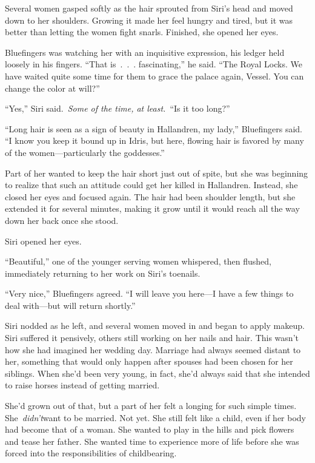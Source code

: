 Several women gasped softly as the hair sprouted from Siri’s head and moved down to her shoulders. Growing it made her feel hungry and tired, but it was better than letting the women fight snarls. Finished, she opened her eyes.

Bluefingers was watching her with an inquisitive expression, his ledger held loosely in his fingers. “That is~.~.~. fascinating,” he said. “The Royal Locks. We have waited quite some time for them to grace the palace again, Vessel. You can change the color at will?”

“Yes,” Siri said.~\textit{Some of the time, at least.}~“Is it too long?”

“Long hair is seen as a sign of beauty in Hallandren, my lady,” Bluefingers said. “I know you keep it bound up in Idris, but here, flowing hair is favored by many of the women—particularly the goddesses.”

Part of her wanted to keep the hair short just out of spite, but she was beginning to realize that such an attitude could get her killed in Hallandren. Instead, she closed her eyes and focused again. The hair had been shoulder length, but she extended it for several minutes, making it grow until it would reach all the way down her back once she stood.

Siri opened her eyes.

“Beautiful,” one of the younger serving women whispered, then flushed, immediately returning to her work on Siri’s toenails.

“Very nice,” Bluefingers agreed. “I will leave you here—I have a few things to deal with—but will return shortly.”

Siri nodded as he left, and several women moved in and began to apply makeup. Siri suffered it pensively, others still working on her nails and hair. This wasn’t how she had imagined her wedding day. Marriage had always seemed distant to her, something that would only happen after spouses had been chosen for her siblings. When she’d been very young, in fact, she’d always said that she intended to raise horses instead of getting married.

She’d grown out of that, but a part of her felt a longing for such simple times. She~\textit{didn’t}want to be married. Not yet. She still felt like a child, even if her body had become that of a woman. She wanted to play in the hills and pick flowers and tease her father. She wanted time to experience more of life before she was forced into the responsibilities of childbearing.

